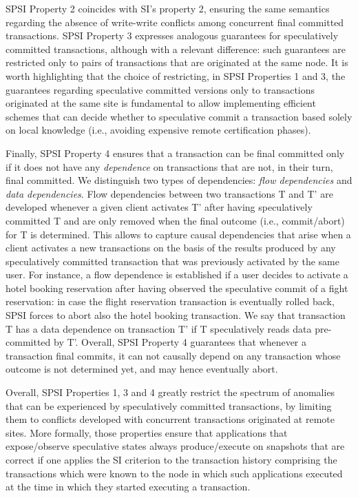 SPSI Property 2 coincides with SI's property 2, ensuring the same semantics regarding the absence of write-write conflicts among concurrent final committed transactions. SPSI Property 3 expresses analogous guarantees for speculatively committed transactions, although with a relevant difference: such guarantees are restricted only to pairs of transactions that are originated at the same node. It is worth highlighting that the choice of restricting, in SPSI Properties 1 and 3, the guarantees regarding speculative committed versions only to transactions originated at the same site is fundamental to allow implementing efficient schemes that can decide whether to speculative commit a transaction based solely on local knowledge (i.e., avoiding expensive remote certification phases).

Finally, SPSI Property 4 ensures that a transaction can be final committed only if it does not have any \textit{dependence} on transactions that are not, in their turn, final committed.
We distinguish two types of dependencies: \textit{flow dependencies} and \textit{data dependencies}. Flow dependencies  between two transactions T and T' are developed whenever a given client activates T' after having speculatively committed T and are only removed when the final outcome (i.e., commit/abort) for T is determined. This allows to capture  causal dependencies that arise when a client activates a new transactions on the basis of the results produced by any speculatively committed transaction that was previously activated by the same user. For instance, a flow dependence is established if a user decides to activate a hotel booking reservation after having observed the speculative commit of a fight reservation: in case the flight reservation transaction is eventually rolled back, SPSI forces to abort also the hotel booking transaction. We say that transaction T has a data dependence on transaction T' if T speculatively reads data pre-committed by T'. 
Overall, SPSI Property 4  guarantees that whenever a transaction final commits, it can not causally depend on any  transaction whose outcome is not determined yet, and may hence eventually abort.

Overall, SPSI Properties 1, 3 and 4 greatly restrict the spectrum of anomalies that can be experienced by speculatively committed transactions, by limiting them to conflicts developed with concurrent transactions originated at remote sites. More formally, those properties ensure that applications that expose/observe speculative states always produce/execute on snapshots  that are correct if one applies the SI criterion to the transaction history comprising the transactions which were known to the node in which such applications executed at the time in which they started executing a transaction. 

